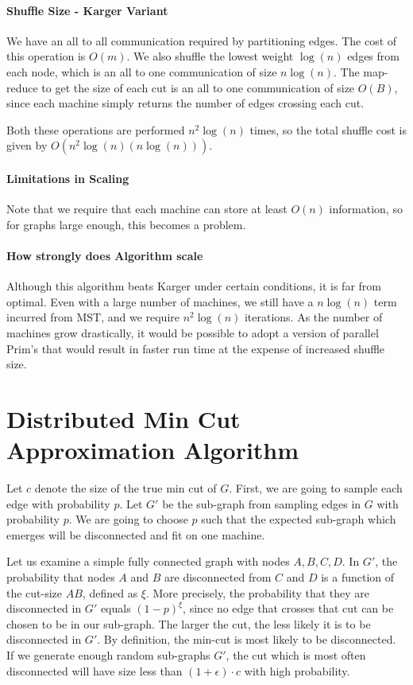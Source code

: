\documentclass[12pt]{article}
\begin{document}
\paragraph{Shuffle Size - Karger Variant}

We have an all to all communication required by partitioning edges. The cost of this operation is $O(m)$. We also shuffle the lowest weight $\log(n)$ edges from each node, which is an all to one communication of size $n \log(n)$. The map-reduce to get the size of each cut is an all to one communication of size $O(B)$, since each machine simply returns the number of edges crossing each cut.

Both these operations are performed $n^2\log(n)$ times, so the total shuffle cost is given by $O(n^2\log(n) (n \log(n)))$. 

\paragraph{Limitations in Scaling}

Note that we require that each machine can store at least $O(n)$ information, so for graphs large enough, this becomes a problem.

\paragraph{How strongly does Algorithm scale} Although this algorithm beats Karger under certain conditions, it is far from optimal. Even with a large number of machines, we still have a $n\log(n)$ term incurred from MST, and we require $n^2 \log(n)$ iterations. As the number of machines grow drastically, it would be possible to adopt a version of parallel Prim's that would result in faster run time at the expense of increased shuffle size.

\section*{Distributed Min Cut Approximation Algorithm}

Let $c$ denote the size of the true min cut of $G$. First, we are going to sample each edge with probability $p$. Let $G'$ be the sub-graph from sampling edges in $G$ with probability $p$. We are going to choose $p$ such that the expected sub-graph which emerges will be disconnected and fit on one machine. 

Let us examine a simple fully connected graph with nodes $A, B, C, D$.  In $G'$, the probability that nodes $A$ and $B$ are disconnected from $C$ and $D$ is a function of the cut-size $AB$, defined as $\xi$. More precisely, the probability that they are disconnected in $G'$ equals $(1-p)^\xi$, since no edge that crosses that cut can be chosen to be in our sub-graph. The larger the cut, the less likely it is to be disconnected in $G'$. By definition, the min-cut is most likely to be disconnected. If we generate enough random sub-graphs $G'$, the cut which is most often disconnected will have size less than $(1+\epsilon) \cdot c$ with high probability.
\end{document}
